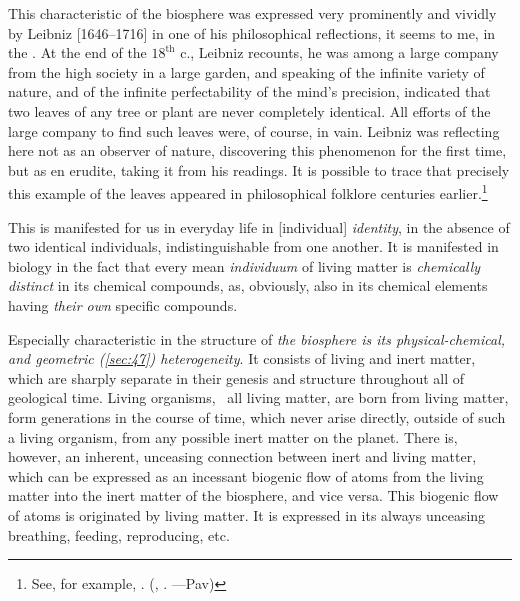 This characteristic of the biosphere was expressed very prominently and vividly
by Leibniz [1646--1716] in one of his philosophical reflections, it seems to
me, in the .  At the end of the $18^\mathrm{th}$ c., Leibniz recounts, he was among a
large company from the high society in a large garden, and speaking of the
infinite variety of nature, and of the infinite perfectability of the mind's
precision, indicated that two leaves of
any tree or plant are never completely identical.  All efforts of the large
company to find such leaves were, of course, in vain.  Leibniz was reflecting
here not as an observer of nature, discovering this phenomenon for the first
time, but as en erudite, taking it from his readings.  It is possible to trace
that precisely this example of the leaves appeared in philosophical folklore
centuries earlier.\footnote{
	See, for example, \cite[кн.~2,
	с.~54]{carus1913prirode}\nocite{carus1936prirode, carus1851nature}.
	(\Eg, \cite[book~2]{carus1851nature}. ---Pav)
}

This is manifested for us in everyday life in [individual]
\emph{identity}, in the absence of two identical
individuals, indistinguishable from one another.  It is manifested in biology
in the fact that every mean \emph{individuum} of living
matter is \emph{chemically distinct} in its chemical compounds, as, obviously,
also in its chemical elements having \emph{their own} specific compounds.


\Section %
Especially characteristic in the structure of \emph{the biosphere is its
physical-chemical, and geometric \emph{(\autoref{sec:47})} heterogeneity}.  It
consists of living and inert matter, which are sharply separate in their
genesis and structure throughout all of geological time.  Living organisms,
\ie\ all living matter, are born from living matter,  form
generations in the course of time, which never arise directly, outside of such
a living organism, from any possible inert matter on the planet.  There is,
however, an inherent, unceasing connection between inert and living matter, which can be expressed
as an incessant biogenic flow of atoms from the living matter into the inert
matter of the biosphere, and vice versa.  This biogenic flow of atoms is
originated by living matter.  It is expressed in its always unceasing
breathing, feeding, reproducing, etc.

